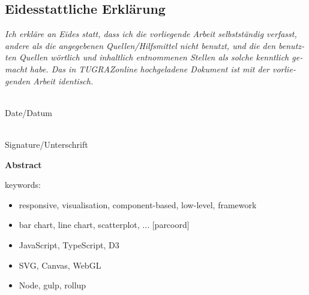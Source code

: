 \vspace{1cm}


\begin{otherlanguage}{austrian}

    \subsection*{Eidesstattliche Erklärung}
    \noindent
    \textit{
        Ich erkläre an Eides statt, dass ich die vorliegende Arbeit
        selbstständig verfasst, andere als die angegebenen Quellen/Hilfsmittel
        nicht benutzt, und die den benutzten Quellen wörtlich und inhaltlich
        entnommenen Stellen als solche kenntlich gemacht habe. Das in
        TUGRAZonline hochgeladene Dokument ist mit der vorliegenden
        Arbeit identisch.}

    \vspace{2cm}

    \noindent
    \parbox[top]{4cm}{
        \begin{center}
            \underline{\hspace*{4cm}} \\
            Date/Datum
        \end{center}
    }
    \hfill
    \parbox[top]{6cm}{
        \begin{center}
            \underline{\hspace*{6cm}} \\
            Signature/Unterschrift
        \end{center}
    }

\end{otherlanguage}






\cleardoublepage

\vspace*{2cm}

\begin{center}
    {\Large\sffamily\bfseries Abstract}
\end{center}


keywords:

\begin{itemize}
    \item responsive, visualisation, component-based, low-level, framework
    \item bar chart, line chart, scatterplot, ...  [parcoord]
    \item JavaScript, TypeScript, D3
    \item SVG, Canvas, WebGL
    \item Node, gulp, rollup
\end{itemize}




